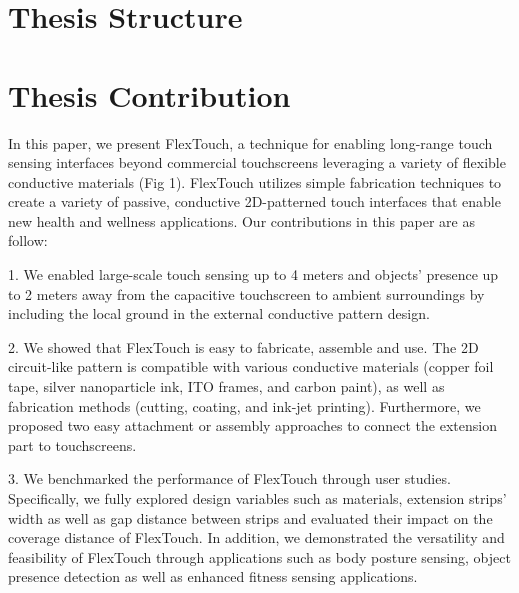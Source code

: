 \section{Thesis Structure}
\label{sec:thesis structure}


\section{Thesis Contribution}
\label{sec:contrib}
In this paper, we present FlexTouch, a technique for enabling long-range touch sensing interfaces beyond commercial touchscreens leveraging a variety of flexible conductive materials (Fig 1). FlexTouch utilizes simple fabrication techniques to create a variety of passive, conductive 2D-patterned touch interfaces that enable new health and wellness applications. Our contributions in this paper are as follow:

1. We enabled large-scale touch sensing up to 4 meters and objects’ presence up to 2 meters away from the capacitive touchscreen to ambient surroundings by including the local ground in the external conductive pattern design.

2. We showed that FlexTouch is easy to fabricate, assemble and use. The 2D circuit-like pattern is compatible with various conductive materials (copper foil tape, silver nanoparticle ink, ITO frames, and carbon paint), as well as fabrication methods (cutting, coating, and ink-jet printing). Furthermore, we proposed two easy attachment or assembly approaches to connect the extension part to touchscreens.

3. We benchmarked the performance of FlexTouch through user studies. Specifically, we fully explored design variables such as materials, extension strips’ width as well as gap distance between strips and evaluated their impact on the coverage distance of FlexTouch. In addition, we demonstrated the versatility and feasibility of FlexTouch through applications such as body posture sensing, object presence detection as well as enhanced fitness sensing applications.